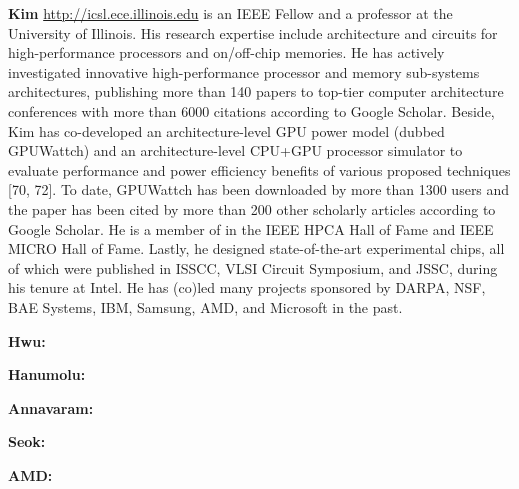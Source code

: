 \noindent
\textbf{Kim} \url{http://icsl.ece.illinois.edu} is an IEEE Fellow and a professor at the University of Illinois. 
His research expertise include architecture and circuits for high-performance processors and on/off-chip memories. 
He has actively investigated innovative high-performance processor and memory sub-systems architectures, publishing more than 140 papers to top-tier computer architecture conferences with more than 6000 citations according to Google Scholar. 
Beside, Kim has co-developed an architecture-level GPU power model (dubbed GPUWattch) and an architecture-level CPU+GPU processor simulator to evaluate performance and power efficiency benefits of various proposed techniques [70, 72]. 
To date, GPUWattch has been downloaded by more than 1300 users and the paper has been cited by more than 200 other scholarly articles according to Google Scholar. 
He is a member of in the IEEE HPCA Hall of Fame and IEEE MICRO Hall of Fame. Lastly, he designed state-of-the-art experimental chips, all of which were published in ISSCC, VLSI Circuit Symposium, and JSSC, during his tenure at Intel.
He has (co)led many projects sponsored by DARPA, NSF, BAE Systems, IBM, Samsung, AMD, and Microsoft in the past. 

\noindent
\textbf{Hwu:}

\noindent
\textbf{Hanumolu:}

\noindent
\textbf{Annavaram:}

\noindent
\textbf{Seok:}

\noindent
\textbf{AMD:}
